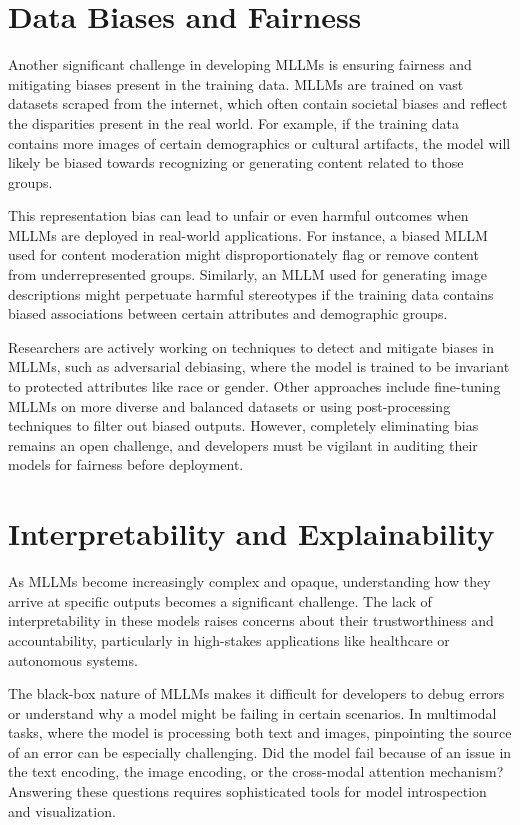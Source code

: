 \section{Data Biases and Fairness}

Another significant challenge in developing MLLMs is ensuring fairness and mitigating biases present in the training data. MLLMs are trained on vast datasets scraped from the internet, which often contain societal biases and reflect the disparities present in the real world. For example, if the training data contains more images of certain demographics or cultural artifacts, the model will likely be biased towards recognizing or generating content related to those groups.

This representation bias can lead to unfair or even harmful outcomes when MLLMs are deployed in real-world applications. For instance, a biased MLLM used for content moderation might disproportionately flag or remove content from underrepresented groups. Similarly, an MLLM used for generating image descriptions might perpetuate harmful stereotypes if the training data contains biased associations between certain attributes and demographic groups.

Researchers are actively working on techniques to detect and mitigate biases in MLLMs, such as adversarial debiasing, where the model is trained to be invariant to protected attributes like race or gender. Other approaches include fine-tuning MLLMs on more diverse and balanced datasets or using post-processing techniques to filter out biased outputs. However, completely eliminating bias remains an open challenge, and developers must be vigilant in auditing their models for fairness before deployment.

\section{Interpretability and Explainability}

As MLLMs become increasingly complex and opaque, understanding how they arrive at specific outputs becomes a significant challenge. The lack of interpretability in these models raises concerns about their trustworthiness and accountability, particularly in high-stakes applications like healthcare or autonomous systems.

The black-box nature of MLLMs makes it difficult for developers to debug errors or understand why a model might be failing in certain scenarios. In multimodal tasks, where the model is processing both text and images, pinpointing the source of an error can be especially challenging. Did the model fail because of an issue in the text encoding, the image encoding, or the cross-modal attention mechanism? Answering these questions requires sophisticated tools for model introspection and visualization.

